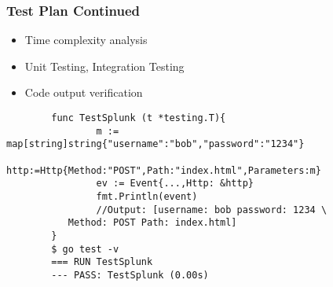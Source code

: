 \begin{frame}[fragile]
\frametitle{Test Plan Continued}
\begin{itemize} %
        \item Time complexity analysis
    \item Unit Testing, Integration Testing
        \item Code output verification
        \end{itemize}

\begin{example} %
\begin{verbatim}
        func TestSplunk (t *testing.T){
                m := map[string]string{"username":"bob","password":"1234"}
                http:=Http{Method:"POST",Path:"index.html",Parameters:m}
                ev := Event{...,Http: &http}
                fmt.Println(event)
                //Output: [username: bob password: 1234 \
           Method: POST Path: index.html]       
        }
        $ go test -v
        === RUN TestSplunk
        --- PASS: TestSplunk (0.00s)
\end{verbatim}
\end{example}
\end{frame}


